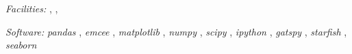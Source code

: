 \documentclass[twocolumn]{emulateapj}%
\newcommand{\project}[1]{\textsl{#1}}
\begin{document}
{\it Facilities:} , , 

{\it Software: }
 \project{pandas} \citep{mckinney10},
 \project{emcee} \citep{foreman13},
 \project{matplotlib} \citep{hunter07},
 \project{numpy} \citep{vanderwalt11},
 \project{scipy} \citep{jones01},
 \project{ipython} \citep{perez07},
 \project{gatspy} \citep{JakeVanderplas2015},
 \project{starfish} \citep{czekala15},
 \project{seaborn} \citep{waskom14}

\clearpage



\end{document}
